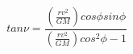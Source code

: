 \begin{equation*}
tan \nu = \frac{\left(\frac{rv^{2}}{GM}\right)cos\phi sin\phi}{\left(\frac{rv^{2}}{GM}\right)cos^{2}\phi - 1} \tag{4.31}
\end{equation*}
